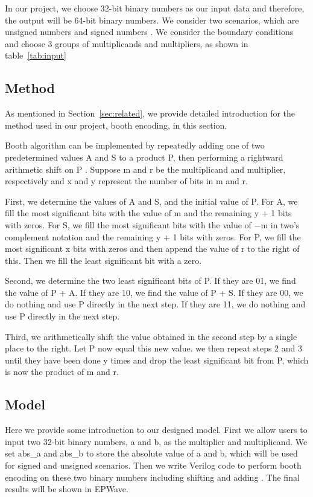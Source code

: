 \documentclass[twoside,twocolumn]{article}
\begin{document}
In our project, we choose 32-bit binary numbers as our input data and therefore, the output will be 64-bit binary numbers. We consider two scenarios, which are unsigned numbers and signed numbers \cite{booth1951signed}. We consider the boundary conditions and choose 3 groups of multiplicands and multipliers, as shown in table~\ref{tab:input}

\subsection{Method}

As mentioned in Section~\ref{sec:related}, we provide detailed introduction for the method used in our project, booth encoding, in this section.

Booth algorithm can be implemented by repeatedly adding one of two predetermined values A and S to a product P, then performing a rightward arithmetic shift on P \cite{chandel2013booth}. Suppose m and r be the multiplicand and multiplier, respectively and x and y represent the number of bits in m and r.

First, we determine the values of A and S, and the initial value of P. For A, we fill the most significant bits with the value of m and the remaining y + 1 bits with zeros. For S, we fill the most significant bits with the value of −m in two's complement notation and the remaining y + 1 bits with zeros. For P, we fill the most significant x bits with zeros and then append the value of r to the right of this. Then we fill the least significant bit with a zero.

Second, we determine the two least significant bits of P. If they are 01, we find the value of P + A. If they are 10, we find the value of P + S. If they are 00, we do nothing and use P directly in the next step. If they are 11, we do nothing and use P directly in the next step.

Third, we arithmetically shift the value obtained in the second step by a single place to the right. Let P now equal this new value. we then repeat steps 2 and 3 until they have been done y times and drop the least significant bit from P, which is now the product of m and r.

\subsection{Model}

Here we provide some introduction to our designed model. First we allow users to input two 32-bit binary numbers, a and b, as the multiplier and multiplicand. We set abs\_a and abs\_b to store the absolute value of a and b, which will be used for signed and unsigned scenarios. Then we write Verilog code to perform booth encoding on these two binary numbers including shifting and adding \cite{deng2015synchronous}. The final results will be shown in EPWave.
\end{document}
